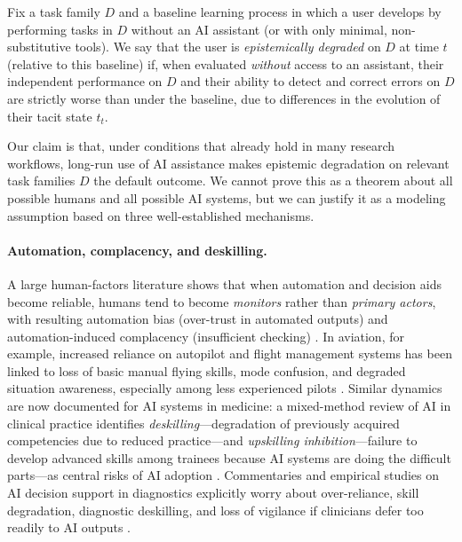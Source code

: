 \begin{definition}
\label{def:epistemic-degradation}
Fix a task family $D$ and a baseline learning process in which a user develops by
performing tasks in $D$ without an AI assistant (or with only minimal, non-substitutive
tools). We say that the user is \emph{epistemically degraded} on $D$ at time $t$ (relative to
this baseline) if, when evaluated \emph{without} access to an assistant, their independent
performance on $D$ and their ability to detect and correct errors on $D$ are strictly worse
than under the baseline, due to differences in the evolution of their tacit state $t_t$.
\end{definition}

Our claim is that, under conditions that already hold in many research workflows, long-run
use of AI assistance makes epistemic degradation on relevant task families $D$ the default
outcome. We cannot prove this as a theorem about all possible humans and all possible AI
systems, but we can justify it as a modeling assumption based on three well-established
mechanisms.

\paragraph{Automation, complacency, and deskilling.}
A large human-factors literature shows that when automation and decision aids become
reliable, humans tend to become \emph{monitors} rather than \emph{primary actors}, with
resulting automation bias (over-trust in automated outputs) and automation-induced
complacency (insufficient checking) \citep[e.g.][]{brown_effect_automation_aviation_2017,
okine_evolution_hf_aviation_2025,singh_automation_complacency_2024}. In aviation,
for example, increased reliance on autopilot and flight management systems has been linked
to loss of basic manual flying skills, mode confusion, and degraded situation awareness,
especially among less experienced pilots \citep{brown_effect_automation_aviation_2017,
okine_evolution_hf_aviation_2025}. Similar dynamics are now documented for AI systems
in medicine: a mixed-method review of AI in clinical practice identifies
\emph{deskilling}---degradation of previously acquired competencies due to reduced
practice---and \emph{upskilling inhibition}---failure to develop advanced skills among
trainees because AI systems are doing the difficult parts---as central risks of AI adoption
\citep{natali_ai_deskilling_medicine_2025}. Commentaries and empirical studies on AI
decision support in diagnostics explicitly worry about over-reliance, skill degradation,
diagnostic deskilling, and loss of vigilance if clinicians defer too readily to AI outputs
\citep{sunday_behavioral_impacts_diagnostics_2025,berzin_preserving_clinical_skills_2025,
fatima_ai_triage_deskilling_2025}.

